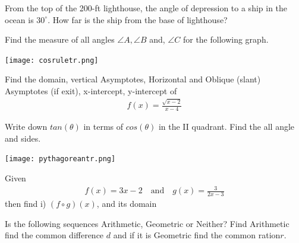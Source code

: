 \documentclass[11pt]{exam}
\begin{document}
\begin{questions}
\vspace{8cm}
\addpoints
\question[4] From the top of the 200-ft lighthouse, the angle of depression to a ship in the ocean is $30^\circ$. How far is the ship from the base of lighthouse?


\newpage
\addpoints
\question[4] Find the measure of all angles $\angle A, \angle B$ and, $\angle C$ for the following graph.
\begin{center}
	\texttt{[image: cosruletr.png]}
\end{center}


\vspace{8cm}
\addpoints
\question[6]  Find the domain, vertical Asymptotes, Horizontal and Oblique (slant) Asymptotes (if exit), x-intercept, y-intercept of   
\begin{align*}
f(x)=\frac{\sqrt{x-2}}{x-4}
\end{align*}
 
\vspace{8cm}
\noaddpoints
\question[4] Write down $tan(\theta)$ in terms of $cos(\theta)$ in the II quadrant. 
	\vspace{8cm}
\question[4] Find the all angle and sides. 
\begin{center}
	\texttt{[image: pythagoreantr.png]}
\end{center}

\vspace{10cm}
\question[4] Given 
\begin{align*}
f(x)=3x-2\quad \mbox{and} \quad g(x)=\frac{3}{2x-3}
\end{align*} 
then find i) $(f\circ g)(x)$, and its domain 

\vspace{8cm}
\noaddpoints
\question[4] Is the following sequences Arithmetic, Geometric or Neither? Find Arithmetic find the common difference $d$ and if it is Geometric find the common ration$r$.
\end{questions}
\end{document}
